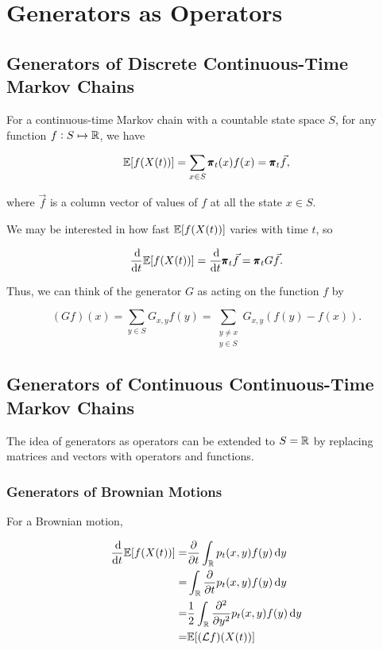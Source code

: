 \section{Generators as Operators}

\subsection{Generators of Discrete Continuous-Time Markov Chains}

For a continuous-time Markov chain with a countable state space $S$, for any function $f: S \mapsto \mathbb{R}$, we have 

\begin{equation*}
    \mathbb{E} [f(X(t))] = \sum_{x \in S} \pmb{\pi}_t(x) f(x) = \pmb{\pi}_t \vec{f},
\end{equation*}

where $\vec{f}$ is a column vector of values of $f$ at all the state $x \in S$.

We may be interested in how fast $\mathbb{E} [f(X(t))]$ varies with time $t$, so 

\begin{equation*}
    \frac{\dif}{\dif t} \E [f(X(t))] = \frac{\dif}{\dif t}\mbf{\pi}_t \vec{f} = \mbf{\pi}_t G \vec{f}.
\end{equation*}

Thus, we can think of the generator $G$ as acting on the function $f$ by 

\begin{equation*}
    (Gf) (x) = \sum_{y \in S} G_{x, y} f(y) = \sum_{\substack{y \neq x \\ y \in S}} G_{x, y} (f(y) - f(x)).
\end{equation*}

\subsection{Generators of Continuous Continuous-Time Markov Chains}

The idea of generators as operators can be extended to $S = \mathbb{R}$ by replacing matrices and vectors with operators and functions.

\subsubsection{Generators of Brownian Motions}
 For a Brownian motion,

\begin{align*}
    \frac{\dif}{\dif t} \E [f(X(t))] = & \frac{\partial}{\partial t} \int_\mbb{R} p_t(x, y) f(y) \dif y \\ 
    = & \int_\mbb{R} \frac{\partial}{\partial t} p_t(x, y) f(y) \dif y \\ 
    = & \frac{1}{2} \int_\mbb{R} \frac{\partial^2}{\partial y^2} p_t(x, y) f(y) \dif y \\ 
    = & \E [(\mathcal{L}f)(X(t))]
\end{align*}

